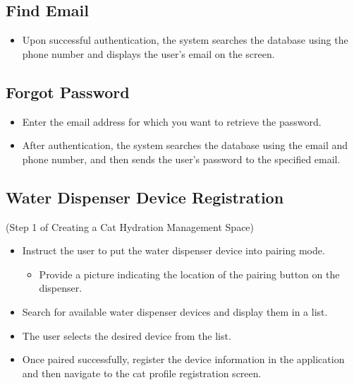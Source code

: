 \documentclass[conference]{IEEEtran}
\begin{document}
\subsection{Find Email}
\begin{itemize}
\item Upon successful authentication, the system searches the database using the phone number and displays the user's email on the screen.\\
\end{itemize}

\subsection{Forgot Password}
\begin{itemize}
\item Enter the email address for which you want to retrieve the password.
\item After authentication, the system searches the database using the email and phone number, and then sends the user's password to the specified email.\\
\end{itemize} 

\subsection{Water Dispenser Device Registration}
(Step 1 of Creating a Cat Hydration Management Space)
\begin{itemize}
\item Instruct the user to put the water dispenser device into pairing mode.
    \begin{itemize}
        \item Provide a picture indicating the location of the pairing button on the dispenser.
    \end{itemize}
\item Search for available water dispenser devices and display them in a list.
\item The user selects the desired device from the list.
\item Once paired successfully, register the device information in the application and then navigate to the cat profile registration screen.\\
\end{itemize}
\end{document}
